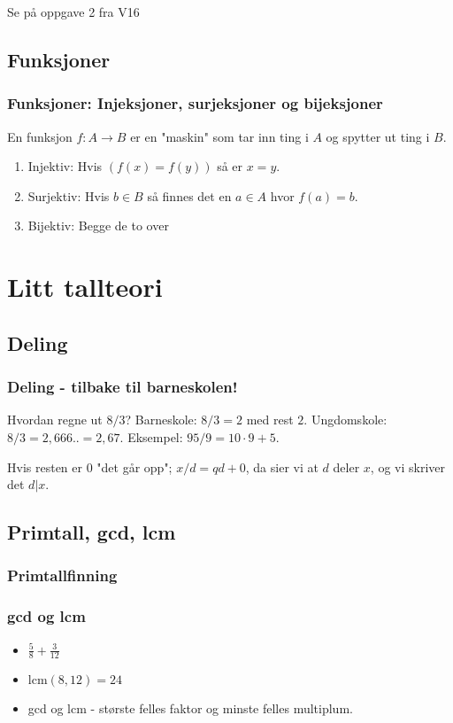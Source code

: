 \documentclass{beamer}
\begin{document}
\begin{frame}
Se på oppgave 2 fra V16
\end{frame}

\subsection{Funksjoner}
\begin{frame}
	\frametitle{Funksjoner: Injeksjoner, surjeksjoner og bijeksjoner}
	En funksjon $f:A \rightarrow B$ er en "maskin" som tar inn ting i $A$ og spytter ut ting i $B$.
	
	\begin{enumerate}
		\item Injektiv: Hvis $(f(x) = f(y))$ så er $x = y$.
		\item Surjektiv: Hvis $b \in B$ så finnes det en $a \in A$ hvor $f(a) = b$.
		\item Bijektiv: Begge de to over
	\end{enumerate}
\end{frame}


\section{Litt tallteori}

\subsection{Deling}

\begin{frame}
	\frametitle{Deling - tilbake til barneskolen!}
	Hvordan regne ut $8/3$? Barneskole: $8/3 = 2$ med rest $2$. Ungdomskole: $8/3 = 2,666.. = 2,67$. Eksempel: $95/9 = 10\cdot9 + 5$. \linebreak
	
	Hvis resten er 0 "det går opp"; $x/d = qd + 0$, da sier vi at $d$ deler $x$, og vi skriver det $d|x$.
\end{frame}

\subsection{Primtall, gcd, lcm}

\begin{frame}
	\frametitle{Primtallfinning}
\end{frame}

\begin{frame}
	\frametitle{gcd og lcm}
	\begin{itemize}
		\item $\frac{5}{8} + \frac{3}{12}$
		\item $\text{lcm}(8,12) = 24$
		\item gcd og lcm - største felles faktor og minste felles multiplum.

	\end{itemize}
\end{frame}
\end{document}
